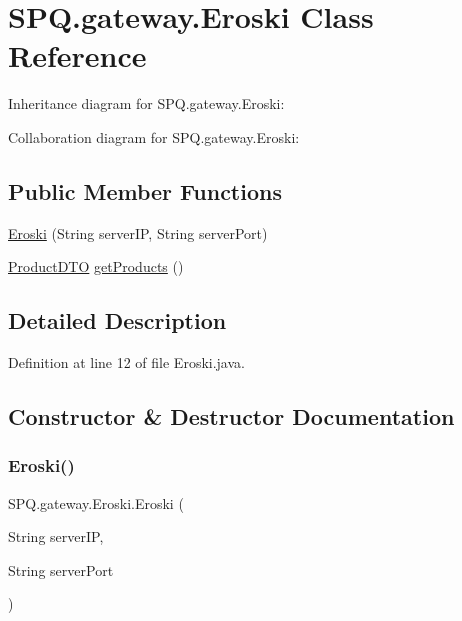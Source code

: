 \hypertarget{class_s_p_q_1_1gateway_1_1_eroski}{}\section{S\+P\+Q.\+gateway.\+Eroski Class Reference}
\label{class_s_p_q_1_1gateway_1_1_eroski}


Inheritance diagram for S\+P\+Q.\+gateway.\+Eroski\+:


Collaboration diagram for S\+P\+Q.\+gateway.\+Eroski\+:
\subsection*{Public Member Functions}
\begin{DoxyCompactItemize}
\item 
\mbox{\hyperlink{class_s_p_q_1_1gateway_1_1_eroski_a3cc7f464fb202689cf62501ffb5ede18}{Eroski}} (String server\+IP, String server\+Port)
\item 
\mbox{\hyperlink{class_s_p_q_1_1dto_1_1_product_d_t_o}{Product\+D\+TO}} \mbox{\hyperlink{class_s_p_q_1_1gateway_1_1_eroski_acfd174565206c16fb55489786957b8de}{get\+Products}} ()
\end{DoxyCompactItemize}


\subsection{Detailed Description}


Definition at line 12 of file Eroski.\+java.



\subsection{Constructor \& Destructor Documentation}
\mbox{\label{class_s_p_q_1_1gateway_1_1_eroski_a3cc7f464fb202689cf62501ffb5ede18}} 
\subsubsection{\texorpdfstring{Eroski()}{Eroski()}}
{\footnotesize\ttfamily S\+P\+Q.\+gateway.\+Eroski.\+Eroski (\begin{DoxyParamCaption}\item[{String}]{server\+IP,  }\item[{String}]{server\+Port }\end{DoxyParamCaption})}




